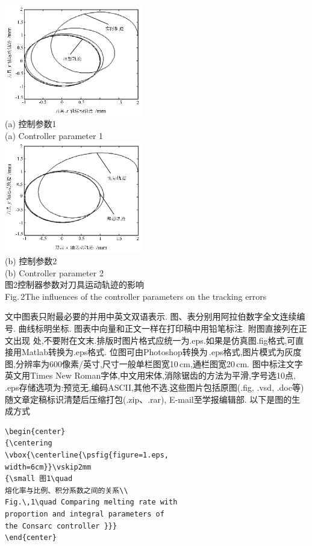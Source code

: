 \documentclass[fontset=mac]{aas}
\begin{document}
\begin{center}
    \includegraphics[width=6cm]{02a.eps} \\
    {\small (a) 控制参数1 \\ (a) Controller parameter 1} \\
    \includegraphics[width=6cm]{02b.eps} \\
    {\small (b) 控制参数2 \\ (b) Controller parameter 2} \\
    \vskip 2mm%
    {\small 图2\quad 控制器参数对刀具运动轨迹的影响 \\
    Fig.\,2\quad The influences %
    of the controller parameters on the tracking errors}
\end{center}

文中图表只附最必要的并用中英文双语表示.
图、表分别用阿拉伯数字全文连续编号. 曲线标明坐标.
图表中向量和正文一样在打印稿中用铅笔标注. 附图直接列在正文出现
处,不要附在文末.排版时图片格式应统一为.eps.如果是仿真图.fig格式,可直接用Matlab转换为.eps格式.
位图可由Photoshop转换为\,.eps格式,图片模式为灰度图,分辨率为600像素/英寸,尺寸一般单栏图宽10\,cm,通栏图宽20\,cm.
图中标注文字英文用Times New
Roman字体,中文用宋体,消除锯齿的方法为平滑,字号选10点,
.eps存储选项为:预览无,编码ASCII,其他不选.这些图片包括原图(.fig,
.vsd, .doc等)随文章定稿标识清楚后压缩打包(.zip、.rar),
E-mail至学报编辑部. 以下是图的生成方式

\begin{verbatim}
\begin{center}
{\centering
\vbox{\centerline{\psfig{figure=1.eps,
width=6cm}}\vskip2mm
{\small 图1\quad
熔化率与比例、积分系数之间的关系\\
Fig.\,1\quad Comparing melting rate with
proportion and integral parameters of
the Consarc controller }}}
\end{center}
\end{verbatim}
\end{document}
